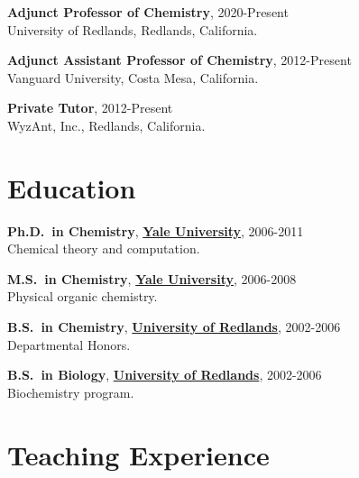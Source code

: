 \documentclass[10pt]{article}
\newcommand*\eduitem[4]{\textbf{#1}, \textbf{#2}, #3\\#4}
\newcommand*\careeritem[4]{\textbf{#1}, #2\\#3, #4}
\begin{document}
\careeritem{Adjunct Professor of Chemistry}{2020-Present}
{University of Redlands}{Redlands, California.}

\careeritem{Adjunct Assistant Professor of Chemistry}{2012-Present}
{Vanguard University}{Costa Mesa, California.}

\careeritem{Private Tutor}{2012-Present}
{WyzAnt, Inc.}{Redlands, California.}


\section{Education}


\eduitem{Ph.D.\ in Chemistry}{\href{http://www.yale.edu/}{Yale University}}{2006-2011}
{Chemical theory and computation.} 

\eduitem{M.S.\ in Chemistry}{\href{http://www.yale.edu/}{Yale University}}{2006-2008}
{Physical organic chemistry.} 

\eduitem{B.S.\ in Chemistry}{\href{http://www.redlands.edu/}{University of Redlands}}{2002-2006}
{Departmental Honors.} 

\eduitem{B.S.\ in Biology}{\href{http://www.redlands.edu/}{University of Redlands}}{2002-2006}
{Biochemistry program.} 


\section{Teaching Experience}

\end{document}
